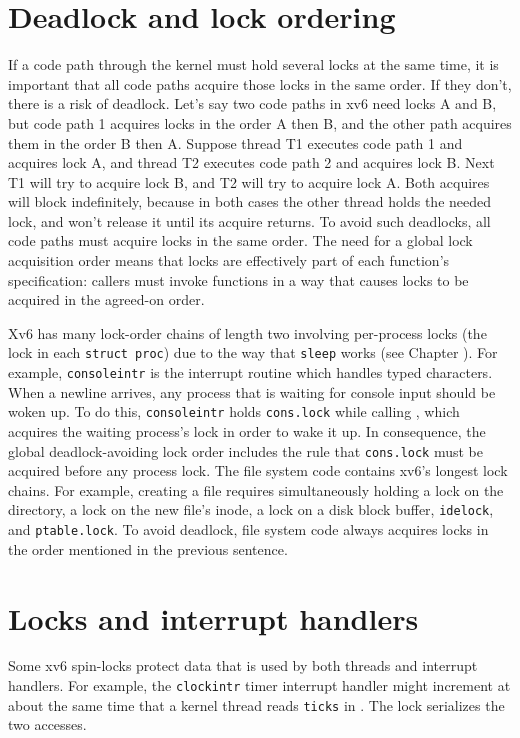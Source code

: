 \section{Deadlock and lock ordering}
If a code path through the kernel must hold several locks at the same time, it is
important that all code paths acquire those locks in the same order.  If
they don't, there is a risk of deadlock.  Let's say two code paths in
xv6 need locks A and B, but code path 1 acquires locks in the order A
then B, and the other path acquires them in the order B then A.
Suppose thread T1 executes code path 1 and acquires lock A,
and thread T2 executes code path 2 and acquires lock B.
Next T1 will try to acquire lock B, and T2 will try to acquire lock A.
Both acquires will block indefinitely, because in both cases the
other thread holds the needed lock, and won't release it until
its acquire returns.
To avoid such deadlocks, all code paths must acquire
locks in the same order. The need for a global lock acquisition order
means that locks are effectively part of each function's specification: 
callers must invoke functions in a way that causes locks to be acquired
in the agreed-on order.

Xv6 has many lock-order chains of length two involving
per-process locks
(the lock in each
\lstinline{struct proc})
due to the way that
\lstinline{sleep}
works (see Chapter
\*[CH:SCHED]).
For example,
\lstinline{consoleintr}
is the interrupt routine which handles typed characters.
When a newline arrives, any process that is waiting for
console input should be woken up.
To do this,
\lstinline{consoleintr}
holds
\lstinline{cons.lock}
while calling 
,
which acquires 
the waiting process's lock in order to wake it up.
In consequence, the global deadlock-avoiding
lock order includes the rule that
\lstinline{cons.lock}
must be acquired before any process lock.
The file system code contains xv6's longest lock chains.
For example, creating a file requires simultaneously
holding a lock on the directory, a lock on the new file's inode,
a lock on a disk block buffer, 
\lstinline{idelock},
and
\lstinline{ptable.lock}.
To avoid deadlock, file system code always acquires locks in the order 
mentioned in the previous sentence.
\section{Locks and interrupt handlers}
Some xv6 spin-locks protect data that is used by
both threads and interrupt handlers.
For example, the
\lstinline{clockintr}
timer interrupt handler might increment
at about the same time that a kernel
thread reads
\lstinline{ticks} 
in
.
The lock
serializes the two accesses.

